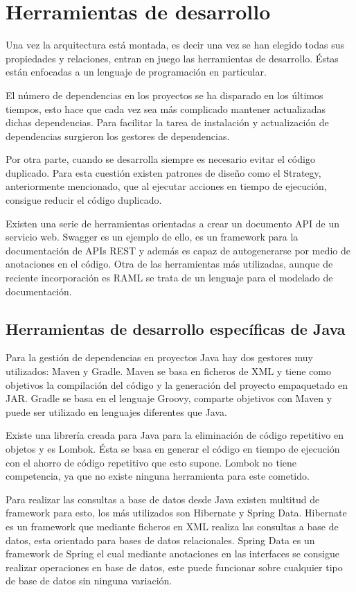 \documentclass[12pt]{report} %
\begin{document}
\section{Herramientas de desarrollo}

Una vez la arquitectura está montada, es decir una vez se han elegido todas sus propiedades y relaciones, entran en juego las herramientas de desarrollo. Éstas están enfocadas a un lenguaje de programación en particular.

El número de dependencias en los proyectos se ha disparado en los últimos tiempos, esto hace que cada vez sea más complicado mantener actualizadas dichas dependencias. Para facilitar la tarea de instalación y actualización de dependencias surgieron los gestores de dependencias.

Por otra parte, cuando se desarrolla siempre es necesario evitar el código duplicado. Para esta cuestión existen patrones de diseño como el Strategy, anteriormente mencionado, que al ejecutar acciones en tiempo de ejecución, consigue reducir el código duplicado.

Existen una serie de herramientas orientadas a crear un documento API de un servicio web. Swagger es un ejemplo de ello, es un framework para la documentación de APIs REST y además es capaz de autogenerarse por medio de anotaciones en el código. Otra de las herramientas más utilizadas, aunque de reciente incorporación es RAML se trata de un lenguaje para el modelado de documentación.

\subsection{Herramientas de desarrollo específicas de Java}

Para la gestión de dependencias en proyectos Java hay dos gestores muy utilizados: Maven y Gradle. Maven se basa en ficheros de XML y tiene como objetivos la compilación del código y la generación del proyecto empaquetado en JAR. Gradle se basa en el lenguaje Groovy, comparte objetivos con Maven y puede ser utilizado en lenguajes diferentes que Java. 

Existe una librería creada para Java para la eliminación de código repetitivo en objetos y es Lombok.
Ésta se basa en generar el código en tiempo de ejecución con el ahorro de código repetitivo que esto supone. Lombok no tiene competencia, ya que no existe ninguna herramienta para este cometido.

Para realizar las consultas a base de datos desde Java existen multitud de framework para esto, los más utilizados son Hibernate y Spring Data. Hibernate es un framework que mediante ficheros en XML realiza las consultas a base de datos, esta orientado para bases de datos relacionales. Spring Data es un framework de Spring el cual mediante anotaciones en las interfaces se consigue realizar operaciones en base de datos, este puede funcionar sobre cualquier tipo de base de datos sin ninguna variación. 
\end{document}
